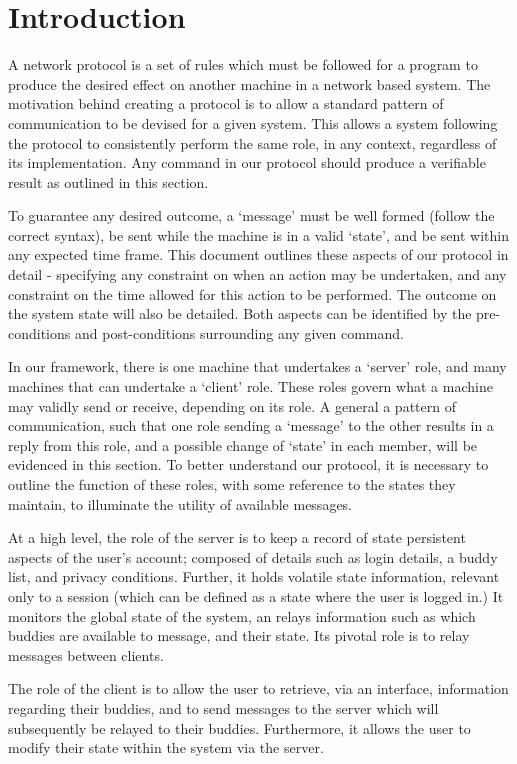 \label{protocol_spec}
\section{Introduction}

A network protocol is a set of rules which must be followed for a program to produce the desired effect on another machine in a network based system. The motivation behind creating a protocol is to allow a standard pattern of communication to be devised for a given system. This allows a system following the protocol to consistently perform the same role, in any context, regardless of its implementation. Any command in our protocol should produce a verifiable result as outlined in this section.

To guarantee any desired outcome, a ‘message’ must be well formed (follow the correct syntax), be sent while the machine is in a valid ‘state’, and be sent within any expected time frame. This document outlines these aspects of our protocol in detail - specifying any constraint on when an action may be undertaken, and any constraint on the time allowed for this action to be performed. The outcome on the system state will also be detailed. Both aspects can be identified by the pre-conditions and post-conditions surrounding any given command.

In our framework, there is one machine that undertakes a ‘server’ role, and many machines that can undertake a ‘client’ role. These roles govern what a machine may validly send or receive, depending on its role. A general a pattern of communication, such that one role sending a ‘message’ to the other results in a reply from this role, and a possible change of ‘state’ in each member, will be evidenced in this section. To better understand our protocol, it is  necessary to outline the function of these roles, with some reference to the states they maintain, to illuminate the utility of available messages.

At a high level, the role of the server is to keep a record of state persistent aspects of the user’s account; composed of details such as login details, a buddy list, and privacy conditions. Further, it holds volatile state information, relevant only to a session (which can be defined as a state where the user is logged in.) It monitors the global state of the system, an relays information such as which buddies are available to message, and their state. Its pivotal role is to relay messages between clients. 

The role of the client is to allow the user to retrieve, via an interface, information regarding their buddies, and to send messages to the server which will subsequently be relayed to their buddies. Furthermore, it allows the user to modify their state within the system via the server.

